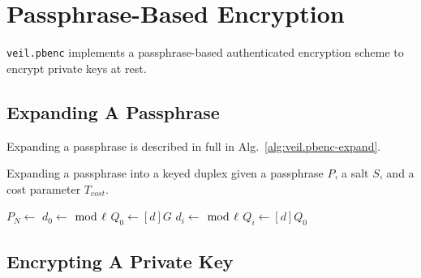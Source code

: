 \section{Passphrase-Based Encryption}\label{sec:veil.pbenc}

\texttt{veil.pbenc} implements a passphrase-based authenticated encryption scheme to encrypt private keys at rest.

\subsection{Expanding A Passphrase}\label{subsec:veil.pbenc-expand}

Expanding a passphrase is described in full in Alg.~\ref{alg:veil.pbenc-expand}\@.

\begin{algorithm}[ht]
    \caption{
        Expanding a passphrase into a keyed duplex given a passphrase $P$, a salt $S$, and a cost parameter $T_{cost}$.
    }
    \begin{algorithmic}
            \State $P_N \gets$
            \State {}
            \State {}
            \State {}
            \State {}
            \State $d_0 \gets$  $\bmod~\ell$
            \State $Q_0 \gets [d]G$
                \State {}
                \State $d_i \gets$  $\bmod~\ell$
                \State $Q_i \gets [d]Q_0$
                \State {}
            \EndFor
            \State {}
        \EndProcedure
    \end{algorithmic}
    \label{alg:veil.pbenc-expand}
\end{algorithm}

\subsection{Encrypting A Private Key}\label{subsec:veil.pbenc-encrypt}

